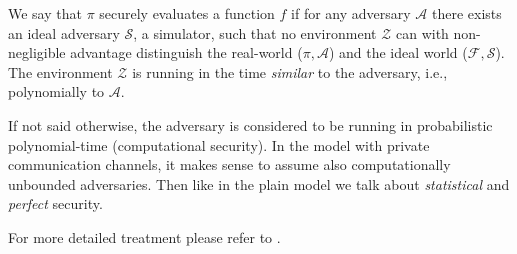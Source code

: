 \documentclass[
  digital, %
  twoside, %
  table,   %
  lof,     %
  lot,     %
]{fithesis3}
\theoremstyle{definition}
\theoremstyle{remark}
\begin{document}

We say that $\pi$ securely evaluates a function $f$ if for any adversary $\mathcal{A}$ there exists an ideal adversary $\mathcal{S}$, a simulator, such that no environment $\mathcal{Z}$ can with non-negligible advantage distinguish the real-world ($\pi, \mathcal{A}$) and the ideal world ($\mathcal{F}, \mathcal{S}$). The environment $\mathcal{Z}$ is running in the time \emph{similar} to the adversary, i.e., polynomially to $\mathcal{A}$.

If not said otherwise, the adversary is considered to be running in probabilistic polynomial-time (computational security). In the model with private communication channels, it makes sense to assume also computationally unbounded adversaries. Then like in the plain model we talk about \emph{statistical} and \emph{perfect} security.

For more detailed treatment please refer to \cite{Can01, CLOS02, Lin03, G09, CDN15, Lin17}.
\end{document}
